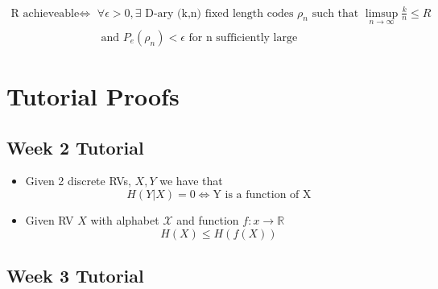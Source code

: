 \documentclass{article}
\begin{document}
\begin{itemize}
    \begin{align*}
        \text{R achieveable} \Longleftrightarrow & \forall \epsilon>0, \exists \text{ D-ary (k,n) fixed length codes } \rho_n \text{ such that } \limsup_{n \to\infty}\frac{k}{n}\leq R \\
         & \text{ and } P_e(\rho_n)<\epsilon \text{ for n sufficiently large}
    \end{align*}
\end{itemize}



\section{Tutorial Proofs}
\subsection{Week 2 Tutorial}
\begin{itemize}
    \item Given 2 discrete RVs, \(X, Y\) we have that
    \[H(Y|X) = 0 \Longleftrightarrow \text{Y is a function of X}\]
    \item Given RV \(X\) with alphabet \(\mathcal{X}\) and function \(f: x \to \mathbb{R}\)
    \[H(X) \leq H(f(X))\]
\end{itemize}
\subsection{Week 3 Tutorial}

\end{document}
